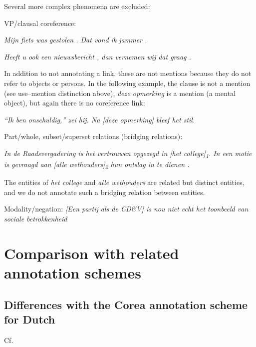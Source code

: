 Several more complex phenomena are excluded:
\begin{itemize*}
\item VP/clausal coreference:

  \emph{\n{[}Mijn fiets was gestolen\n{]} . \n{[}Dat\n{]} vond ik
  jammer .}

  \emph{\n{[}Heeft u ook een nieuwsbericht\n{]} , dan vernemen wij
  \n{[}dat\n{]} graag .}

  In addition to not annotating a link, these are not mentions because
  they do not refer to objects or persons.
  In the following example, the clause is not a mention (see use--mention distinction above), \emph{deze opmerking} is a mention (a mental object),
  but again there is no coreference link:

  \emph{\n{[}``Ik ben onschuldig,''\n{]} zei hij. Na [deze opmerking] bleef het stil.}

\item Part/whole, subset/superset relations (bridging relations):

  \emph{In de Raadsvergadering is het vertrouwen opgezegd in {[}het
  college{]}\textsubscript{1}. In een motie is gevraagd aan {[}alle
  wethouders{]}\textsubscript{2} hun ontslag in te dienen .}

  The entities of \emph{het college} and \emph{alle wethouders} are related
  but distinct entities, and we do not annotate such a bridging relation between entities.

\item Modality/negation:
  \emph{{[}Een partij als de CD\&V{]} is nou niet echt \n{[}het toonbeeld
  van sociale betrokkenheid\n{]}}

\end{itemize*}


\section{Comparison with related annotation schemes}
\subsection{Differences with the Corea annotation scheme for Dutch}
Cf. \citet{bouma2007corea}


